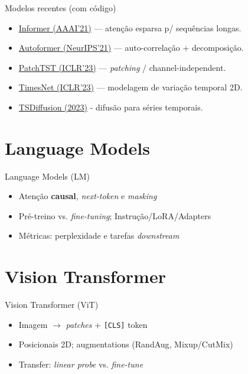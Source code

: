 \documentclass{beamer}
\begin{document}
\begin{frame}{Modelos recentes (com código)}
\footnotesize
\begin{itemize}
  \item \href{https://github.com/zhouhaoyi/Informer2020}{Informer (AAAI'21)} — atenção esparsa p/ sequências longas.
  \item \href{https://github.com/thuml/Autoformer}{Autoformer (NeurIPS'21)} — auto-correlação + decomposição.
  \item \href{https://github.com/yuqinie98/PatchTST}{PatchTST (ICLR'23)} — \textit{patching} / channel-independent.
  \item \href{https://github.com/thuml/TimesNet}{TimesNet (ICLR'23)} — modelagem de variação temporal 2D.
  \item \href{https://github.com/natmourajr/CPE883-2025-02/tree/main/models/tsdiffusion}{TSDiffusion (2023)} - difusão para séries temporais.
\end{itemize}
\end{frame}



\section{Language Models}
\begin{frame}{Language Models (LM)}
	\begin{itemize}
		\item Atenção \textbf{causal}, \textit{next-token} e \textit{masking}
		\item Pré-treino vs. \textit{fine-tuning}; Instrução/LoRA/Adapters
		\item Métricas: perplexidade e tarefas \textit{downstream}
	\end{itemize}
\end{frame}

\section{Vision Transformer}
\begin{frame}{Vision Transformer (ViT)}
	\begin{itemize}
		\item Imagem $\rightarrow$ \textit{patches} + \texttt{[CLS]} token
		\item Posicionais 2D; augmentations (RandAug, Mixup/CutMix)
		\item Transfer: \textit{linear probe} vs. \textit{fine-tune}
	\end{itemize}
\end{frame}
\end{document}
